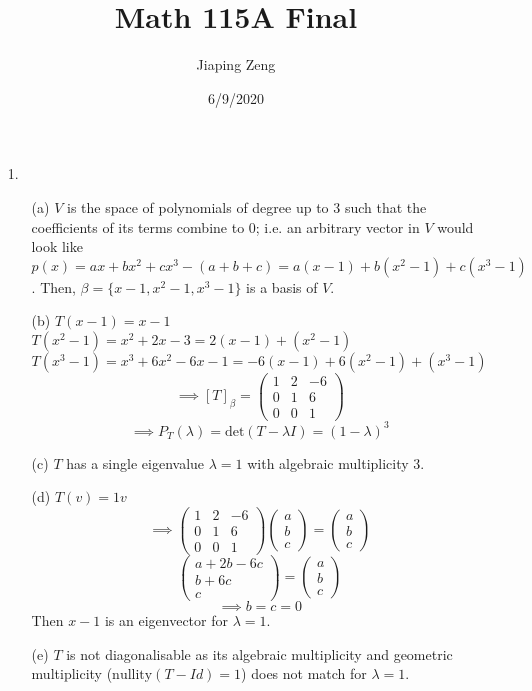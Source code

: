 \documentclass{article}
\title{Math 115A Final}
\author{Jiaping Zeng}
\date{6/9/2020}
\begin{document}

\begin{itemize}
	\item [1.]
	      \begin{itemize}
		      \item [(a)] $V$ is the space of polynomials of degree up to 3 such that the coefficients of its terms combine to 0; i.e. an arbitrary vector in $V$ would look like $p(x)=ax+bx^2+cx^3-(a+b+c)=a(x-1)+b(x^2-1)+c(x^3-1)$. Then, $\beta=\{x-1,x^2-1,x^3-1\}$ is a basis of $V$.
		      \item [(b)] $T(x-1)=x-1$\\$T(x^2-1)=x^2+2x-3=2(x-1)+(x^2-1)$\\$T(x^3-1)=x^3+6x^2-6x-1=-6(x-1)+6(x^2-1)+(x^3-1)$\[\implies[T]_\beta=\begin{pmatrix}
				            1 & 2 & -6 \\0&1&6\\0&0&1
			            \end{pmatrix}\]\[\implies P_T(\lambda)=\text{det}(T-\lambda I)=(1-\lambda)^3\]
		      \item [(c)] $T$ has a single eigenvalue $\lambda=1$ with algebraic multiplicity $3$.
		      \item [(d)] $T(v)=1v$\[\implies\begin{pmatrix}1&2&-6\\0&1&6\\0&0&1\end{pmatrix}\begin{pmatrix}a\\b\\c\end{pmatrix}=\begin{pmatrix}a\\b\\c\end{pmatrix}\]\[\begin{pmatrix}
				            a+2b-6c \\b+6c\\c
			            \end{pmatrix}=\begin{pmatrix}
				            a \\b\\c
			            \end{pmatrix}\]\[\implies b=c=0\]Then $x-1$ is an eigenvector for $\lambda=1$.
		      \item [(e)] $T$ is not diagonalisable as its algebraic multiplicity and geometric multiplicity ($\text{nullity}(T-Id)=1$) does not match for $\lambda=1$.
	      \end{itemize}
\end{itemize}
\end{document}
